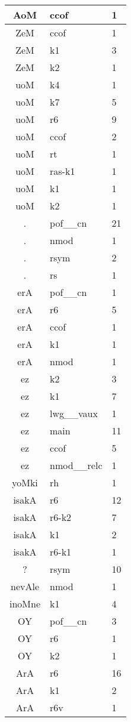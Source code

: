 \documentclass[a4 paper]{article}
\begin{document}
\begin{longtable}{cp{}p{}}
AoM & ccof & 1\\ \midrule 
ZeM & ccof & 1\\ \midrule ZeM & k1 & 3\\ \midrule ZeM & k2 & 1\\ \midrule 
uoM & k4 & 1\\ \midrule uoM & k7 & 5\\ \midrule uoM & r6 & 9\\ \midrule uoM & ccof & 2\\ \midrule uoM & rt & 1\\ \midrule uoM & ras-k1 & 1\\ \midrule uoM & k1 & 1\\ \midrule uoM & k2 & 1\\ \midrule 
. & pof\_\_cn & 21\\ \midrule . & nmod & 1\\ \midrule . & rsym & 2\\ \midrule . & rs & 1\\ \midrule 
erA & pof\_\_cn & 1\\ \midrule erA & r6 & 5\\ \midrule erA & ccof & 1\\ \midrule erA & k1 & 1\\ \midrule erA & nmod & 1\\ \midrule 
ez & k2 & 3\\ \midrule ez & k1 & 7\\ \midrule ez & lwg\_\_vaux & 1\\ \midrule ez & main & 11\\ \midrule ez & ccof & 5\\ \midrule ez & nmod\_\_relc & 1\\ \midrule 
yoMki & rh & 1\\ \midrule 
isakA & r6 & 12\\ \midrule isakA & r6-k2 & 7\\ \midrule isakA & k1 & 2\\ \midrule isakA & r6-k1 & 1\\ \midrule 
? & rsym & 10\\ \midrule 
nevAle & nmod & 1\\ \midrule 
inoMne & k1 & 4\\ \midrule 
OY & pof\_\_cn & 3\\ \midrule OY & r6 & 1\\ \midrule OY & k2 & 1\\ \midrule 
ArA & r6 & 16\\ \midrule ArA & k1 & 2\\ \midrule ArA & r6v & 1\\ \midrule 

\end{longtable}
\end{document}
